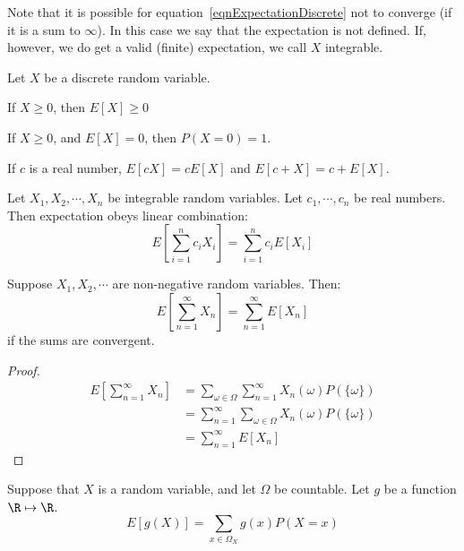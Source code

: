 \documentclass[../Main.tex]{subfiles}
\begin{document}
Note that it is possible for equation~\ref{eqnExpectationDiscrete} not to converge (if it is a sum to $\infty$). In this case we say that the expectation is not defined. If, however, we do get a valid (finite) expectation, we call $X$ integrable.
\begin{propositions}{
        Let $X$ be a discrete random variable.
        \label{propsExpectationProps}
    }
    \item If $X \geq 0$, then $E[X] \geq 0$ \label{propExpecNonNegativity}
    \item If $X \geq 0$, and $E[X] = 0$, then $P(X = 0) = 1$. \label{propExpecZero}
    \item If $c$ is a real number, $E[cX] = cE[X]$ and $E[c + X] = c + E[X]$. \label{propExpecSumProd}
    \item Let $X_1, X_2, \cdots, X_n$ be integrable random variables. Let $c_1, \cdots, c_n$ be real numbers. Then expectation obeys linear combination:
        \begin{equation*}
            E\left[\sum_{i=1}^n c_i X_i\right] = \sum_{i=1}^n c_i E[X_i]
        \end{equation*}
        \label{propExpecLinearCombo}
\end{propositions}
\begin{lemma}
    Suppose $X_1, X_2, \cdots$ are non-negative random variables. Then:
    \begin{equation*}
        E\left[\sum_{n=1}^\infty X_n\right] = \sum_{n=1}^\infty E[X_n]
    \end{equation*}
    if the sums are convergent.
\end{lemma}
\begin{proof}
    \begin{align*}
        E\left[\sum_{n=1}^\infty X_n\right] &= \sum_{\omega \in \Omega} \sum_{n=1}^\infty X_n(\omega) P(\{\omega\}) \\
        &= \sum_{n=1}^\infty \sum_{\omega \in \Omega} X_n(\omega) P(\{\omega\}) \\
        &= \sum_{n=1}^\infty E[X_n]
    \end{align*}
\end{proof}
\begin{proposition}
    Suppose that $X$ is a random variable, and let $\Omega$ be countable. Let $g$ be a function $\R \mapsto \R$.
    \begin{equation*}
        E[g(X)] = \sum_{x \in \Omega_X} g(x) P(X = x)
    \end{equation*}
    \label{propExpecFunc}
\end{proposition}
\end{document}

